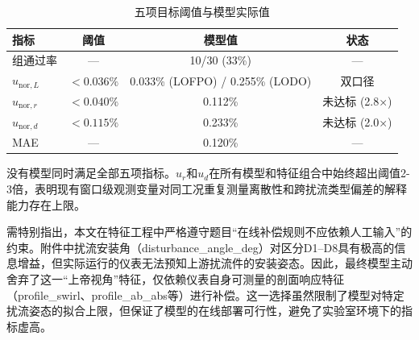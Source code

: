 \begin{table}[H]
\centering
\caption{五项目标阈值与模型实际值}
\label{tab:q4_targets}
\begin{tabular}{lccc}
\toprule
指标 & 阈值 & 模型值 & 状态 \\
\midrule
组通过率 & — & 10/30 (33\%) & — \\
$u_{\text{nor},L}$ & $<0.036\%$ & 0.033\% (LOFPO) / 0.255\% (LODO) & 双口径 \\
$u_{\text{nor},r}$ & $<0.040\%$ & 0.112\% & 未达标 (2.8×) \\
$u_{\text{nor},d}$ & $<0.115\%$ & 0.233\% & 未达标 (2.0×) \\
MAE & — & 0.120\% & — \\
\bottomrule
\end{tabular}
\end{table}

没有模型同时满足全部五项指标。$u_r$和$u_d$在所有模型和特征组合中始终超出阈值2-3倍，表明现有窗口级观测变量对同工况重复测量离散性和跨扰流类型偏差的解释能力存在上限。

需特别指出，本文在特征工程中严格遵守题目“在线补偿规则不应依赖人工输入”的约束。附件中扰流安装角（disturbance\_angle\_deg）对区分D1--D8具有极高的信息增益，但实际运行的仪表无法预知上游扰流件的安装姿态。因此，最终模型主动舍弃了这一“上帝视角”特征，仅依赖仪表自身可测量的剖面响应特征（profile\_swirl、profile\_ab\_abs等）进行补偿。这一选择虽然限制了模型对特定扰流姿态的拟合上限，但保证了模型的在线部署可行性，避免了实验室环境下的指标虚高。
